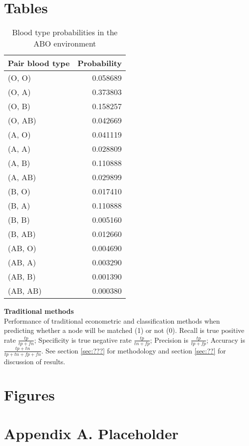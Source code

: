 \documentclass[12pt]{article}
\begin{document}
\clearpage





\clearpage


\section*{Tables} \label{sec:tab}



\begin{table}[H]
\centering
\singlespacing
\begin{tabular}{lr}
\toprule
Pair blood type &         Probability \\
\midrule
(O, O) &  0.058689 \\
(O, A) &  0.373803 \\
(O, B) &  0.158257 \\
(O, AB) &  0.042669 \\
(A, O) &  0.041119 \\
(A, A) &  0.028809 \\
(A, B) &  0.110888 \\
(A, AB) &  0.029899 \\
(B, O) &  0.017410 \\
(B, A) &  0.110888 \\
(B, B) &  0.005160 \\
(B, AB) &  0.012660 \\
(AB, O) &  0.004690 \\
(AB, A) &  0.003290 \\
(AB, B) &  0.001390 \\
(AB, AB) &  0.000380 \\
\bottomrule
\end{tabular}
\caption{Blood type probabilities in the ABO environment}
\label{tab:abo_blood_type}
\end{table}


\begin{table}
  \centering
  \singlespacing
  \hspace*{-3cm}
  
  \caption{\textbf{Traditional methods} \\ Performance of traditional econometric and classification methods when predicting whether a node will be matched (1) or not (0).
  Recall is true positive rate $\frac{tp}{tp+fn}$;
  Specificity is true negative rate $\frac{tp}{tn+fp}$;
  Precision is $\frac{tp}{tp+fp}$; Accuracy is $\frac{tp+tn}{tp+tn+fp+fn}$. See section \ref{sec:???} for methodology and section \ref{sec:??} for discussion of results.
  }
  \label{tab:tradional_ml}
\end{table}



\clearpage

\section*{Figures} \label{sec:fig}




\clearpage

\section*{Appendix A. Placeholder} \label{sec:appendixa}
\end{document}

